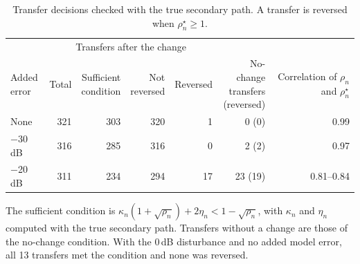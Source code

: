 \begin{table}[tbp]
\centering
\footnotesize
\setlength{\tabcolsep}{4pt}
\caption{Transfer decisions checked with the true secondary path. A transfer is reversed when $\rho^{\star}_n \ge 1$.}
\label{tab:atsip-9}
\par\smallskip
\begin{tabular}{lrrrrrr}
\toprule
 & \multicolumn{4}{c}{Transfers after the change} & & \\
\makecell[l]{Added\\error} & Total & \makecell[r]{Sufficient\\condition} & \makecell[r]{Not\\reversed} & Reversed & \makecell[r]{No-change\\transfers\\(reversed)} & \makecell[r]{Correlation\\of $\rho_n$\\and $\rho^{\star}_n$} \\
\midrule
None & 321 & 303 & 320 & 1 & 0 (0) & 0.99 \\
$-$30\,dB & 316 & 285 & 316 & 0 & 2 (2) & 0.97 \\
$-$20\,dB & 311 & 234 & 294 & 17 & 23 (19) & 0.81--0.84 \\
\bottomrule
\end{tabular}
\par\medskip
\begin{minipage}{0.98\textwidth}
\scriptsize
The sufficient condition is $\kappa_n(1+\sqrt{\rho_n}) + 2\eta_n < 1-\sqrt{\rho_n}$, with $\kappa_n$ and $\eta_n$ computed with the true secondary path. Transfers without a change are those of the no-change condition. With the 0\,dB disturbance and no added model error, all 13 transfers met the condition and none was reversed.\par
\end{minipage}
\par{}
\end{table}
